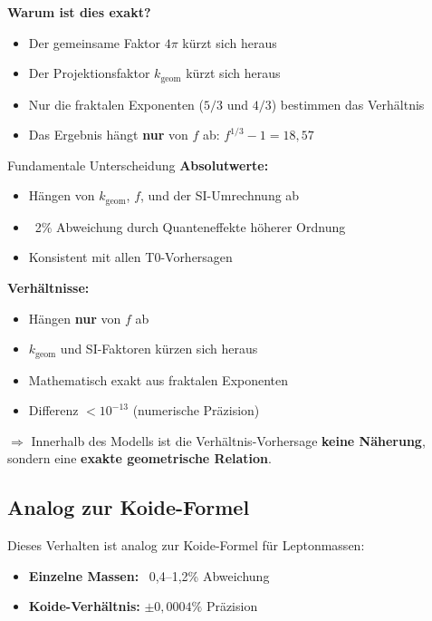 	\textbf{Warum ist dies exakt?}
	
	\begin{itemize}
		\item Der gemeinsame Faktor $4\pi$ kürzt sich heraus
		\item Der Projektionsfaktor $k_{\text{geom}}$ kürzt sich heraus
		\item Nur die fraktalen Exponenten ($5/3$ und $4/3$) bestimmen das Verhältnis
		\item Das Ergebnis hängt \textbf{nur} von $f$ ab: $f^{1/3} - 1 = 18{,}57$
	\end{itemize}
	
	\begin{important}{Fundamentale Unterscheidung}
		\textbf{Absolutwerte:}
		\begin{itemize}
			\item Hängen von $k_{\text{geom}}$, $f$, und der SI-Umrechnung ab
			\item ~2\% Abweichung durch Quanteneffekte höherer Ordnung
			\item Konsistent mit allen T0-Vorhersagen
		\end{itemize}
		
		\textbf{Verhältnisse:}
		\begin{itemize}
			\item Hängen \textbf{nur} von $f$ ab
			\item $k_{\text{geom}}$ und SI-Faktoren kürzen sich heraus
			\item Mathematisch exakt aus fraktalen Exponenten
			\item Differenz $< 10^{-13}$ (numerische Präzision)
		\end{itemize}
		
		$\Rightarrow$ Innerhalb des Modells ist die Verhältnis-Vorhersage \textbf{keine Näherung}, sondern eine \textbf{exakte geometrische Relation}.
	\end{important}
	
	\subsection{Analog zur Koide-Formel}
	
	Dieses Verhalten ist analog zur Koide-Formel für Leptonmassen:
	
	\begin{itemize}
		\item \textbf{Einzelne Massen:} ~0{,}4--1{,}2\% Abweichung
		\item \textbf{Koide-Verhältnis:} $\pm 0{,}0004\%$ Präzision
	\end{itemize}
	
